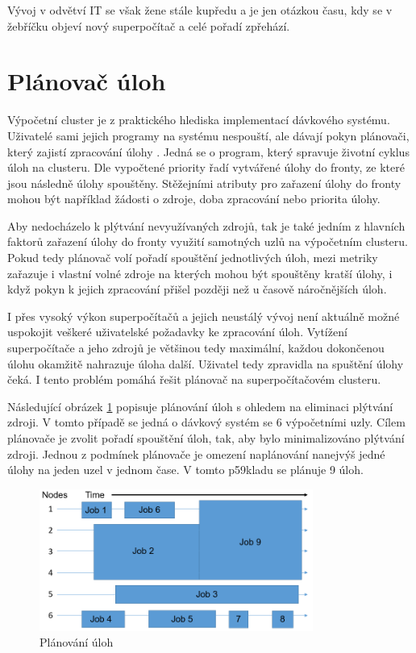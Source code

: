 Vývoj v odvětví IT se však žene stále kupředu a je jen otázkou času, kdy se v žebříčku objeví nový superpočítač a celé pořadí zpřehází.

\section{Plánovač úloh}
Výpočetní cluster je z praktického hlediska implementací dávkového systému. Uživatelé sami jejich programy na systému nespouští, ale dávají pokyn plánovači, který zajistí zpracování úlohy \cite{W94NKRaxvG2L2A1W}. Jedná se o program, který spravuje životní cyklus úloh na clusteru. Dle vypočtené priority řadí vytvářené úlohy do fronty, ze které jsou následně úlohy spouštěny. Stěžejními atributy pro zařazení úlohy do fronty mohou být například žádosti o zdroje, doba zpracování nebo priorita úlohy.

Aby nedocházelo k plýtvání nevyužívaných zdrojů, tak je také jedním z hlavních faktorů zařazení úlohy do fronty využití samotných uzlů na výpočetním clusteru. Pokud tedy plánovač volí pořadí spouštění jednotlivých úloh, mezi metriky zařazuje i vlastní volné zdroje na kterých mohou být spouštěny kratší úlohy, i když pokyn k jejich zpracování přišel později než u časově náročnějších úloh.

I přes vysoký výkon superpočítačů a jejich neustálý vývoj není aktuálně možné uspokojit veškeré uživatelské požadavky ke zpracování úloh. Vytížení superpočítače a jeho zdrojů je většinou tedy maximální, každou dokončenou úlohu okamžitě nahrazuje úloha další. Uživatel tedy zpravidla na spuštění úlohy čeká. I tento problém pomáhá řešit plánovač na superpočítačovém clusteru. 

Následující obrázek \ref{fig:planovani-uloh} popisuje plánování úloh s ohledem na eliminaci plýtvání zdroji. V tomto případě se jedná o dávkový systém se 6 výpočetními uzly. Cílem plánovače je zvolit pořadí spouštění úloh, tak, aby bylo minimalizováno plýtvání zdroji. Jednou z podmínek plánovače je omezení naplánování nanejvýš jedné úlohy na jeden uzel v jednom čase. V tomto p59kladu se plánuje 9 úloh.

\begin{figure}[h]
	\centering
	\includegraphics[width=0.8\textwidth]{Figures/Scheduler.png}
	\caption{Plánování úloh \cite{W94NKRaxvG2L2A1W}}
	\label{fig:planovani-uloh}
\end{figure}

